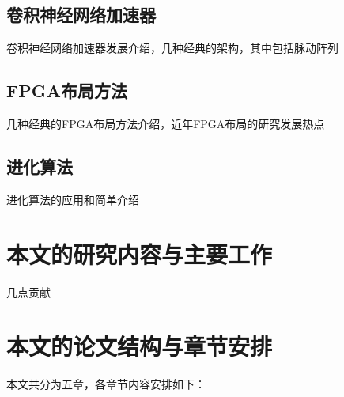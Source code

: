 \subsection{卷积神经网络加速器}
卷积神经网络加速器发展介绍，几种经典的架构，其中包括脉动阵列

\subsection{FPGA布局方法}
几种经典的FPGA布局方法介绍，近年FPGA布局的研究发展热点

\subsection{进化算法}
进化算法的应用和简单介绍


\section{本文的研究内容与主要工作}
几点贡献

\section{本文的论文结构与章节安排}
\label{sec:arrangement}
本文共分为五章，各章节内容安排如下：

